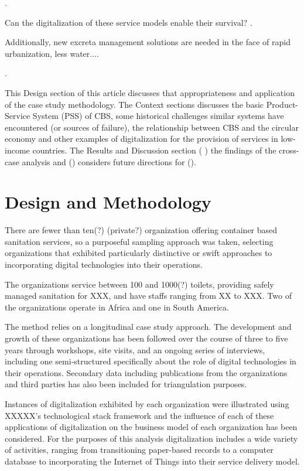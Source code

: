 \documentclass[sustainability,article,submit,moreauthors,pdftex,10pt,a4paper]{mdpi}
\theoremstyle{mdpi}
\newcounter{ex}
\newcounter{re}
\theoremstyle{mdpidefinition}
\begin{document}
.

Can the digitalization of these service models enable their survival? 
.

Additionally, new excreta management solutions are needed in the face of rapid urbanization, less water.... \cite{Larsen2016}

. 

This Design section of this article discusses that appropriateness and application of the case study methodology. The Context sections discusses the basic Product-Service System (PSS) of CBS, some historical challenges similar systems have encountered (or sources of failure), the relationship between CBS and the circular economy and other examples of digitalization for the provision of services in low-income countries. The Results and Discussion section (    ) the findings of the cross-case analysis and () considers future directions for (). 



\section{Design and Methodology}

There are fewer than ten(?) (private?) organization offering container based sanitation services, so a purposeful sampling approach was taken, selecting organizations that exhibited particularly distinctive or swift approaches to incorporating digital technologies into their operations.

The organizations service between 100 and 1000(?) toilets, providing safely managed sanitation for  XXX, and have staffs ranging from XX to XXX. Two of the organizations operate in Africa and one in South America. 

The method relies on a longitudinal case study approach. The development and growth of these  organizations has been followed over the course of three to five years through workshops, site visits, and an ongoing series of interviews, including one semi-structured specifically about the role of digital technologies in their operations. Secondary data including publications from the organizations and third parties has also been included for triangulation purposes. 

Instances of digitalization exhibited by each organization were illustrated using XXXXX's technological stack framework and the influence of each of these applications of digitalization on the business model of each organization has been considered. For the purposes of this analysis digitalization includes a wide variety of activities, ranging from transitioning paper-based records to a computer database to incorporating the Internet of Things into their service delivery model. 
\end{document}
